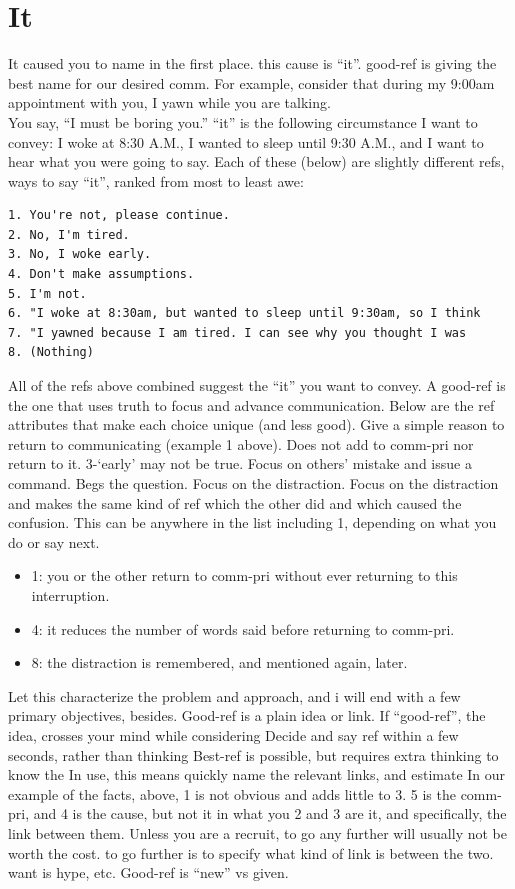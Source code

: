 \documentclass[
]{book}
\providecommand{\tightlist}{%
  \setlength{\itemsep}{0pt}\setlength{\parskip}{0pt}}
\begin{document}
\hypertarget{it}{%
\section{It}\label{it}}

It caused you to name in the first place. this cause is ``it''. good-ref is giving the best name for our desired comm.
For example, consider that during my 9:00am appointment with you, I yawn while you are talking.\\
You say, ``I must be boring you.''
``it'' is the following circumstance I want to convey:
I woke at 8:30 A.M.,
I wanted to sleep until 9:30 A.M., and
I want to hear what you were going to say.
Each of these (below) are slightly different refs, ways to say ``it'', ranked from most to least awe:

\begin{verbatim}
1. You're not, please continue.  
2. No, I'm tired.  
3. No, I woke early.  
4. Don't make assumptions.  
5. I'm not.  
6. "I woke at 8:30am, but wanted to sleep until 9:30am, so I think  
7. "I yawned because I am tired. I can see why you thought I was   
8. (Nothing)  
\end{verbatim}

All of the refs above combined suggest the ``it'' you want to convey.
A good-ref is the one that uses truth to focus and advance communication.
Below are the ref attributes that make each choice unique (and less good).
Give a simple reason to return to communicating (example 1 above).
Does not add to comm-pri nor return to it. 3-`early' may not be true.
Focus on others' mistake and issue a command.
Begs the question.
Focus on the distraction.
Focus on the distraction and makes the same kind of ref which the other did and which caused the confusion.
This can be anywhere in the list including 1, depending on what you do or say next.

\begin{itemize}
\tightlist
\item
  1: you or the other return to comm-pri without ever returning to this interruption.
\item
  4: it reduces the number of words said before returning to comm-pri.
\item
  8: the distraction is remembered, and mentioned again, later.
\end{itemize}

Let this characterize the problem and approach, and i will end with a few primary objectives, besides.
Good-ref is a plain idea or link.
If ``good-ref'', the idea, crosses your mind while considering
Decide and say ref within a few seconds, rather than thinking
Best-ref is possible, but requires extra thinking to know the
In use, this means quickly name the relevant links, and estimate
In our example of the facts, above,
1 is not obvious and adds little to 3.
5 is the comm-pri, and 4 is the cause, but not it in what you
2 and 3 are it, and specifically, the link between them.
Unless you are a recruit, to go any further will usually not be worth the cost. to go further is to specify what kind of link is between the two. want is hype, etc.
Good-ref is ``new'' vs given.
\end{document}
